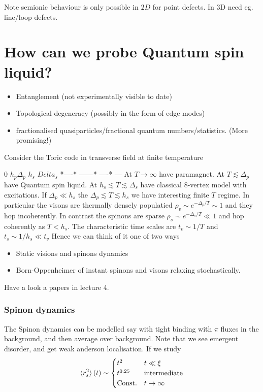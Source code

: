 \documentclass[a4paper]{article}
\begin{document}
Note semionic behaviour is only possible in $2D$ for point defects. In 3D need
eg. line/loop defects.
\section{How can we probe Quantum spin liquid?}
\begin{itemize}
    \item Entanglement (not experimentally visible to date)
    \item Topological degeneracy (possibly in the form of edge modes)
    \item fractionalised quasiparticles/fractional quantum numbers/statistics.
        (More promising!)
\end{itemize}
Consider the Toric code in transverse field at finite temperature


0 $h_p$$\Delta_p$ $h_s$ $Delta_s$
*----* ------* ----* ---
At $T\to \infty$ have paramagnet. At $T\lesssim\Delta_p$ have Quantum spin
liquid. At $h_s\lesssim T\lesssim \Delta_s$ have classical $8$-vertex model with
excitations. If $\Delta_p\ll h_s$
the $\Delta_p\lesssim T \lesssim h_s$ we have interesting finite $T$ regime.
In particular the visons are thermally densely populatied 
$\rho_v\sim e^{-\Delta_p/T}\sim 1$ and they hop incoherently.
In contrast the spinons are sparse $\rho_s\sim e^{-\Delta_s/T}\ll1$ and hop
coherently as $T< h_s$.
The characteristic time scales are 
$t_v \sim 1/T$ and $t_s\sim 1/h_s\ll t_v$ Hence we can think of it one of two
ways
\begin{itemize}
    \item Static visions and spinons dynamics
    \item Born-Oppenheimer of instant spinons and visons relaxing
        stochastically.
\end{itemize}
Have a look a papers in lecture 4. 
\subsubsection{Spinon dynamics}
The Spinon dynamics can be modelled say with tight binding with $\pi$ fluxes in
the background, and then average over background. Note that we see emergent
disorder, and get weak anderson localisation. If we study
\[
    \braket{r_s^2}(t)\sim \begin{cases} t^2& t\ll \xi\\
        t^{0.25} &\text{intermediate}\\
        \mathrm{Const.}&t\to \infty
    \end{cases}
\]
\end{document}

